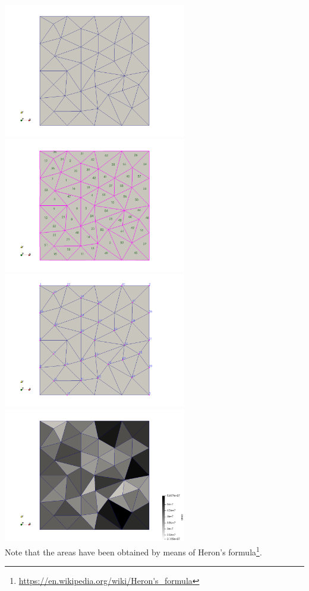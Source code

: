 \begin{center}
\includegraphics[width=8cm]{python_codes/fieldstone_140/images/mesh1}
\includegraphics[width=8cm]{python_codes/fieldstone_140/images/mesh2}\\
\includegraphics[width=8cm]{python_codes/fieldstone_140/images/mesh3}
\includegraphics[width=8cm]{python_codes/fieldstone_140/images/mesh4}\\
{\captionfont Note that the areas have been obtained by means of Heron's 
formula\footnote{\url{https://en.wikipedia.org/wiki/Heron's_formula}}.}
\end{center}

